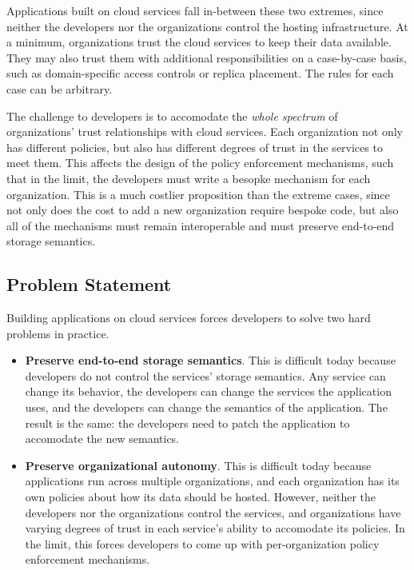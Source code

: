 Applications built on cloud services fall in-between these two extremes, since
neither the developers nor the
organizations control the hosting infrastructure.  At a minimum, organizations
trust the cloud services to keep their data available.
They may also trust them with additional
responsibilities on a case-by-case basis,
such as domain-specific access controls or replica placement.
The rules for each case can be arbitrary.

The challenge to developers is to accomodate the \emph{whole spectrum} of
organizations' trust relationships with cloud services.
Each organization not only has different
policies, but also has different degrees of trust in the services to meet them.
This affects the design of the policy enforcement mechanisms, such that
in the limit, the developers must write a besopke mechanism
for each organization.  This is a much costlier proposition than the extreme
cases, since not only does the cost to add a new organization require bespoke
code, but also all of the mechanisms must remain interoperable and must preserve
end-to-end storage semantics.

\subsection{Problem Statement}

Building applications on cloud services forces developers to solve two hard
problems in practice.

\begin{itemize}
   \item \textbf{Preserve end-to-end storage semantics}.  This is difficult
      today because developers do not
      control the services' storage semantics.  Any service can change its
      behavior, the developers can change the services the application uses, and
      the developers can change the semantics of the application.
      The result is the same:  the developers need to patch the application to
      accomodate the new semantics.

   \item \textbf{Preserve organizational autonomy}.  This is difficult today
      because applications run across multiple organizations,
      and each organization has its own policies about how
      its data should be hosted.  However, neither the developers nor the organizations
      control the services, and organizations have varying degrees of trust in
      each service's ability to accomodate its policies.
      In the limit, this forces developers to come up with
      per-organization policy enforcement mechanisms.
\end{itemize}

